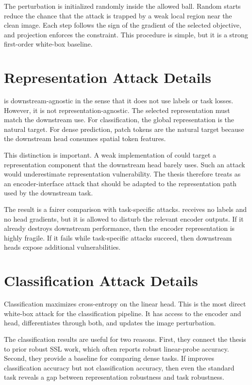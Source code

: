The perturbation is initialized randomly inside the allowed ball. Random starts reduce the chance that the attack is trapped by a weak local region near the clean image. Each step follows the sign of the gradient of the selected objective, and projection enforces the constraint. This procedure is simple, but it is a strong first-order white-box baseline.

\section{Representation Attack Details}

\EmbedAttack is downstream-agnostic in the sense that it does not use labels or task losses. However, it is not representation-agnostic. The selected representation must match the downstream use. For classification, the global representation is the natural target. For dense prediction, patch tokens are the natural target because the downstream head consumes spatial token features.

This distinction is important. A weak implementation of \EmbedAttack could target a representation component that the downstream head barely uses. Such an attack would underestimate representation vulnerability. The thesis therefore treats \EmbedAttack as an encoder-interface attack that should be adapted to the representation path used by the downstream task.

The result is a fairer comparison with task-specific attacks. \EmbedAttack receives no labels and no head gradients, but it is allowed to disturb the relevant encoder outputs. If it already destroys downstream performance, then the encoder representation is highly fragile. If it fails while task-specific attacks succeed, then downstream heads expose additional vulnerabilities.

\section{Classification Attack Details}

Classification \PGD maximizes cross-entropy on the linear head. This is the most direct white-box attack for the classification pipeline. It has access to the encoder and head, differentiates through both, and updates the image perturbation.

The classification results are useful for two reasons. First, they connect the thesis to prior robust SSL work, which often reports robust linear-probe accuracy. Second, they provide a baseline for comparing dense tasks. If \DeACL improves classification \EmbedAttack accuracy but not classification \PGD accuracy, then even the standard task reveals a gap between representation robustness and task robustness.

